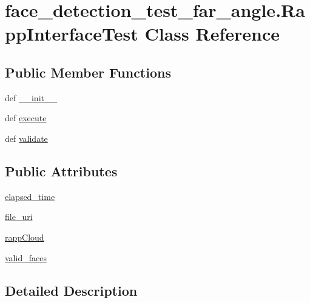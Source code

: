 \hypertarget{classface__detection__test__far__angle_1_1RappInterfaceTest}{\section{face\-\_\-detection\-\_\-test\-\_\-far\-\_\-angle.\-Rapp\-Interface\-Test Class Reference}
\label{classface__detection__test__far__angle_1_1RappInterfaceTest}
}
\subsection*{Public Member Functions}
\begin{DoxyCompactItemize}
\item 
def \hyperlink{classface__detection__test__far__angle_1_1RappInterfaceTest_a63294465220d31ba88bc8b61337a205d}{\-\_\-\-\_\-init\-\_\-\-\_\-}
\item 
def \hyperlink{classface__detection__test__far__angle_1_1RappInterfaceTest_afe737101bb11c220e78931969ffaee5a}{execute}
\item 
def \hyperlink{classface__detection__test__far__angle_1_1RappInterfaceTest_abc6864ec89e5ce08793e8dd63f204974}{validate}
\end{DoxyCompactItemize}
\subsection*{Public Attributes}
\begin{DoxyCompactItemize}
\item 
\hyperlink{classface__detection__test__far__angle_1_1RappInterfaceTest_a9210d01d594b0dea3608217d94a5605a}{elapsed\-\_\-time}
\item 
\hyperlink{classface__detection__test__far__angle_1_1RappInterfaceTest_a46ba4d16c1edf073e87af30df5f548b6}{file\-\_\-uri}
\item 
\hyperlink{classface__detection__test__far__angle_1_1RappInterfaceTest_a53914e4f7b5ce3e75e15f476227a8ebb}{rapp\-Cloud}
\item 
\hyperlink{classface__detection__test__far__angle_1_1RappInterfaceTest_a43da4f563cf8cc2c46264ef57e466ce3}{valid\-\_\-faces}
\end{DoxyCompactItemize}


\subsection{Detailed Description}



